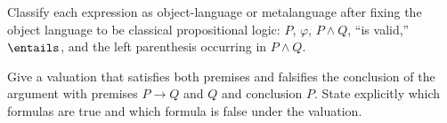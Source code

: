\begin{exercise}
\label{ex:levels-01}
Classify each expression as object-language or metalanguage after fixing the
object language to be classical propositional logic: \(P\), \(\varphi\),
\(P\land Q\), ``is valid,'' \(\entails\), and the left parenthesis occurring in
\(P\land Q\).
\end{exercise}

\begin{exercise}
\label{ex:levels-02}
Give a valuation that satisfies both premises and falsifies the conclusion
of the argument with premises \(P\to Q\) and \(Q\) and conclusion
\(P\).  State explicitly which formulas
are true and which formula is false under the valuation.
\end{exercise}

